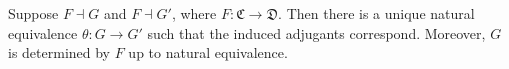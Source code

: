 Suppose $F \dashv G$ and $F \dashv G'$, where $F : \mathfrak{C} \to \mathfrak{D}$. Then there is a unique natural equivalence $\theta : G \to G'$ such that the induced adjugants correspond. Moreover, $G$ is determined by $F$ up to natural equivalence.
